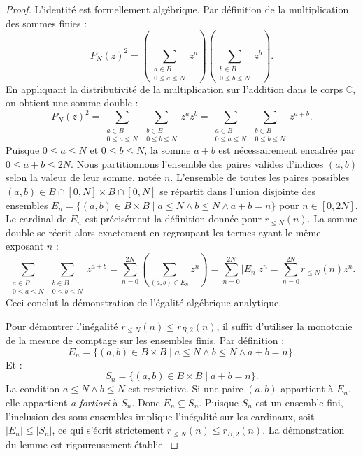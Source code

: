 \documentclass[12pt,a4paper]{article}
\begin{document}
\begin{proof}
L'identit\'e est formellement alg\'ebrique. Par d\'efinition de la multiplication des sommes finies :
\begin{equation}
P_N(z)^2 = \left( \sum_{\substack{a \in B \\ 0 \le a \le N}} z^a \right) \left( \sum_{\substack{b \in B \\ 0 \le b \le N}} z^b \right).
\end{equation}
En appliquant la distributivit\'e de la multiplication sur l'addition dans le corps $\mathbb{C}$, on obtient une somme double :
\begin{equation}
P_N(z)^2 = \sum_{\substack{a \in B \\ 0 \le a \le N}} \sum_{\substack{b \in B \\ 0 \le b \le N}} z^a z^b = \sum_{\substack{a \in B \\ 0 \le a \le N}} \sum_{\substack{b \in B \\ 0 \le b \le N}} z^{a+b}.
\end{equation}
Puisque $0 \le a \le N$ et $0 \le b \le N$, la somme $a+b$ est n\'ecessairement encadr\'ee par $0 \le a+b \le 2N$. Nous partitionnons l'ensemble des paires valides d'indices $(a,b)$ selon la valeur de leur somme, not\'ee $n$. L'ensemble de toutes les paires possibles $(a,b) \in B \cap [0, N] \times B \cap [0, N]$ se r\'epartit dans l'union disjointe des ensembles $E_n = \{ (a,b) \in B \times B \mid a \le N \land b \le N \land a+b = n \}$ pour $n \in [0, 2N]$.
Le cardinal de $E_n$ est pr\'ecis\'ement la d\'efinition donn\'ee pour $r_{\le N}(n)$. La somme double se r\'ecrit alors exactement en regroupant les termes ayant le m\^eme exposant $n$ :
\begin{equation}
\sum_{\substack{a \in B \\ 0 \le a \le N}} \sum_{\substack{b \in B \\ 0 \le b \le N}} z^{a+b} = \sum_{n=0}^{2N} \left( \sum_{(a,b) \in E_n} z^n \right) = \sum_{n=0}^{2N} |E_n| z^n = \sum_{n=0}^{2N} r_{\le N}(n) z^n.
\end{equation}
Ceci conclut la d\'emonstration de l'\'egalit\'e alg\'ebrique analytique.

Pour d\'emontrer l'in\'egalit\'e $r_{\le N}(n) \le r_{B,2}(n)$, il suffit d'utiliser la monotonie de la mesure de comptage sur les ensembles finis. Par d\'efinition :
\begin{equation}
E_n = \{ (a,b) \in B \times B \mid a \le N \land b \le N \land a+b = n \}.
\end{equation}
Et :
\begin{equation}
S_n = \{ (a,b) \in B \times B \mid a+b = n \}.
\end{equation}
La condition $a \le N \land b \le N$ est restrictive. Si une paire $(a,b)$ appartient \`a $E_n$, elle appartient \textit{a fortiori} \`a $S_n$. Donc $E_n \subseteq S_n$. Puisque $S_n$ est un ensemble fini, l'inclusion des sous-ensembles implique l'in\'egalit\'e sur les cardinaux, soit $|E_n| \le |S_n|$, ce qui s'\'ecrit strictement $r_{\le N}(n) \le r_{B,2}(n)$. La d\'emonstration du lemme est rigoureusement \'etablie.
\end{proof}
\end{document}
